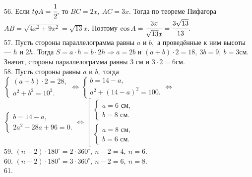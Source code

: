 \documentclass[12pt]{article}
\begin{document}
56. Если $tg A=\cfrac{1}{2},$ то $BC=2x,\ AC=3x.$ Тогда по теореме Пифагора $AB=\sqrt{4x^2+9x^2}=\sqrt{13}x.$ Поэтому $\cos A=\cfrac{3x}{\sqrt{13}x}=\cfrac{3\sqrt{13}}{13}.$\\
57. Пусть стороны параллелограмма равны $a$ и $b,$ а проведённые к ним высоты --- $h$ и $2h.$ Тогда $S=a\cdot h=b\cdot 2h\Rightarrow a=2b$ и $(a+b)\cdot2=18,\ 3b=9,\ b=3$см. Значит, стороны параллелограмма равны 3 см и $3\cdot2=6$см.\\
58. Пусть стороны равны $a$ и $b,$ тогда $\begin{cases}(a+b)\cdot2=28,\\ a^2+b^2=10^2.\end{cases}\Leftrightarrow
\begin{cases}b=14-a,\\ a^2+(14-a)^2=100.\end{cases}\Leftrightarrow$\\$
\begin{cases}b=14-a,\\ 2a^2-28a+96=0.\end{cases}\Leftrightarrow
\left[\begin{array}{l}\begin{cases}a=6\text{ см},\\ b=8\text{ см}.\end{cases}\\ \begin{cases}a=8\text{ см},\\ b=6\text{ см}.\end{cases}\end{array}\right.$\\
59. $(n-2)\cdot180^\circ=2\cdot360^\circ,\ n-2=4,\ n=6.$\\
60. $(n-2)\cdot180^\circ=3\cdot360^\circ,\ n-2=6,\ n=8.$\\
61. \begin{figure}[ht!]
\end{figure}\\
\end{document}
